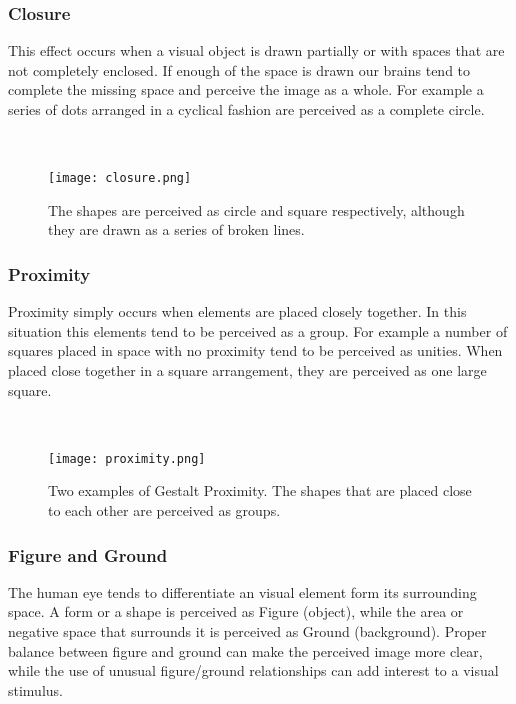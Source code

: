 \documentclass[16pt]{extreport}
\begin{document}
\subsubsection{Closure}
	\parbox{\linewidth}{
	\justify
	\large{
	This effect occurs when a visual object is drawn partially or with spaces that are not completely enclosed. If enough of the space is drawn our brains tend to complete the missing space and perceive the image as a whole. For example a series of dots arranged in a cyclical fashion are perceived as a complete circle.}}
\hfill \break \\[1cm]

	\begin{center}
	\begin{figure}[h]
		\centering
		\texttt{[image: closure.png]}
		\caption[]{The shapes are perceived as circle and square respectively, although they are drawn as a series of broken lines.}
	\end{figure}
	\end{center}
	\clearpage
	
\subsubsection{Proximity}
	\parbox{\linewidth}{
	\justify
	\large{
	Proximity simply occurs when elements are placed closely together. In this situation this elements tend to be perceived as a group. For example a number of squares placed in space with no proximity tend to be perceived as unities. When placed close together in a square arrangement, they are perceived as one large square. }}
\hfill \break \\[1cm]

	\begin{center}
	\begin{figure}[h]
		\centering
		\texttt{[image: proximity.png]}
		\caption[]{Two examples of Gestalt Proximity. The shapes that are placed close to each other are perceived as groups.}
	\end{figure}
	\end{center}
	\clearpage
	
\subsubsection{Figure and Ground}
	\parbox{\linewidth}{
	\justify
	\large{
	The human eye tends to differentiate an visual element form its surrounding space. A form or a shape is perceived as Figure (object), while the area or negative space that surrounds it is perceived as Ground (background). Proper balance between figure and ground can make the perceived image more clear, while the use of unusual figure/ground relationships can add interest to a visual stimulus. }}
\hfill \break \\[1cm]
\end{document}
